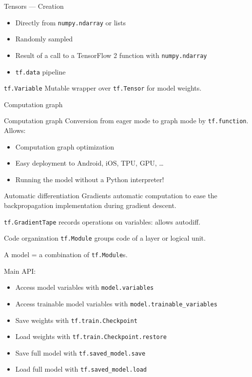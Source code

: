 \begin{frame}{Tensors --- Creation}
  \begin{itemize}
    \item Directly from \texttt{numpy.ndarray} or lists
    \item Randomly sampled
    \item Result of a call to a TensorFlow 2 function with \texttt{numpy.ndarray}
    \item \texttt{tf.data} pipeline
  \end{itemize}
\end{frame}

\begin{frame}{\texttt{tf.Variable}}
  Mutable wrapper over \texttt{tf.Tensor} for model weights.
\end{frame}

\begin{frame}{Computation graph}
\end{frame}

\begin{frame}{Computation graph}
  Conversion from eager mode to graph mode by \texttt{tf.function}. Allows:

  \begin{itemize}
    \item Computation graph optimization
    \item Easy deployment to Android, iOS, TPU, GPU, …
    \item Running the model without a Python interpreter!
  \end{itemize}
\end{frame}

\begin{frame}{Automatic differentiation}
  Gradients automatic computation to ease the backpropagation implementation during gradient descent.

  \texttt{tf.GradientTape} records operations on variables: allows autodiff.
\end{frame}

\begin{frame}{Code organization}
  \texttt{tf.Module} groups code of a layer or logical unit.

  A model = a combination of \texttt{tf.Module}s.

  Main API:

  \begin{itemize}
    \item Access model variables with \texttt{model.variables}
    \item Access trainable model variables with \texttt{model.trainable\_variables}
    \item Save weights with \texttt{tf.train.Checkpoint}
    \item Load weights with \texttt{tf.train.Checkpoint.restore}
    \item Save full model with \texttt{tf.saved\_model.save}
    \item Load full model with \texttt{tf.saved\_model.load}
  \end{itemize}
\end{frame}